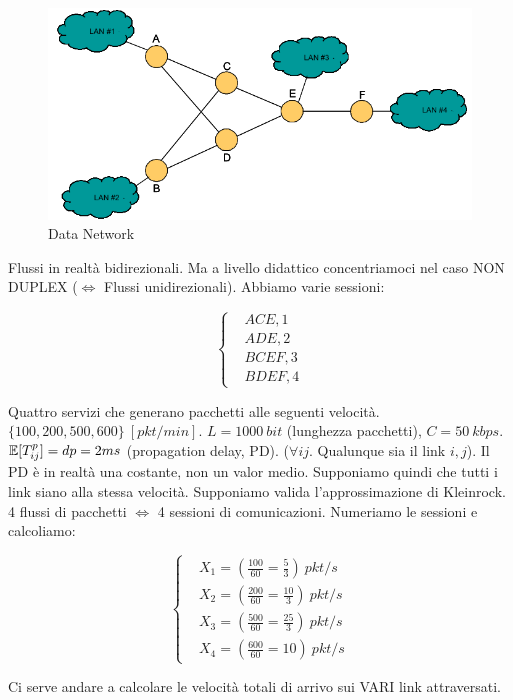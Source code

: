 \begin{center}
\begin{figure}[H]
\centering
\includegraphics[scale=0.8]{figures/ex/mdn.png}
\caption{Data Network}
\end{figure}
\end{center}

Flussi in realtà bidirezionali. Ma a livello didattico concentriamoci nel caso NON DUPLEX ($\iff$ Flussi unidirezionali). Abbiamo varie sessioni:

\[
	\left\{
	\begin{aligned}
	&ACE, 1\\
	&ADE, 2\\
	&BCEF, 3\\
	&BDEF, 4
	\end{aligned}
	\right.
\]

Quattro servizi che generano pacchetti alle seguenti velocità. $\{100,200,500,600\}\  [pkt/min]$. $\mathit{L}=1000\ bit$ (lunghezza pacchetti), $C=50\ kbps$. $\operatorname{\mathbb{E}}[T_{ij}^p]=dp=2ms$ (propagation delay, PD). ($\forall ij$. Qualunque sia il link $i,j$). Il PD è in realtà una costante, non un valor medio. Supponiamo quindi che tutti i link siano alla stessa velocità. Supponiamo valida l'approssimazione di Kleinrock. 4 flussi di pacchetti $\iff$ 4 sessioni di comunicazioni. Numeriamo le sessioni e calcoliamo:

\[
	\left\{
	\begin{aligned}
	&X_1 = (\frac{100}{60} = \frac{5}{3})\ pkt/s\\
	&X_2 = (\frac{200}{60} = \frac{10}{3})\ pkt/s\\
	&X_3 = (\frac{500}{60} = \frac{25}{3})\ pkt/s\\
	&X_4 = (\frac{600}{60} = 10)\ pkt/s
	\end{aligned}
	\right.
\]

Ci serve andare a calcolare le velocità totali di arrivo sui VARI link attraversati. 

